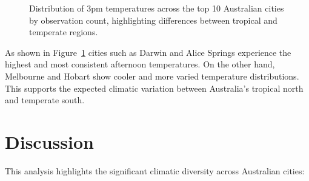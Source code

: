 \documentclass[
  letterpaper,
  DIV=11,
  numbers=noendperiod]{scrartcl}
\begin{document}
\begin{figure}[H]


\caption{\label{fig-temp-boxplot}Distribution of 3pm temperatures across
the top 10 Australian cities by observation count, highlighting
differences between tropical and temperate regions.}

\end{figure}%

As shown in Figure~\ref{fig-temp-boxplot} cities such as Darwin and
Alice Springs experience the highest and most consistent afternoon
temperatures. On the other hand, Melbourne and Hobart show cooler and
more varied temperature distributions. This supports the expected
climatic variation between Australia's tropical north and temperate
south.

\section{Discussion}\label{discussion}

This analysis highlights the significant climatic diversity across
Australian cities:
\end{document}
